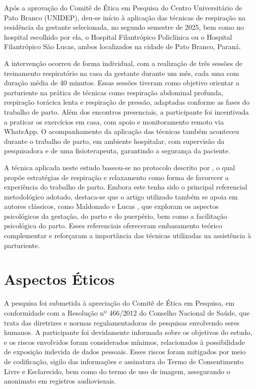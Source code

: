 \documentclass[openright]{normas-utf-tex}
\begin{document}
Após a aprovação do Comitê de Ética em Pesquisa do Centro Universitário de Pato Branco (UNIDEP), deu-se início à aplicação das técnicas de respiração na residência da gestante selecionada, no segundo semestre de 2025, bem como no hospital escolhido por ela, o Hospital Filantrópico Policlínica ou o Hospital Filantrópico São Lucas, ambos localizados na cidade de Pato Branco, Paraná.

A intervenção ocorreu de forma individual, com a realização de três sessões de treinamento respiratório na casa da gestante durante um mês, cada uma com duração média de 40 minutos. Essas sessões tiveram como objetivo orientar a parturiente na prática de técnicas como respiração abdominal profunda, respiração torácica lenta e respiração de pressão, adaptadas conforme as fases do trabalho de parto. Além dos encontros presenciais, a participante foi incentivada a praticar os exercícios em casa, com apoio e monitoramento remoto via WhatsApp. O acompanhamento da aplicação das técnicas também aconteceu durante o trabalho de parto, em ambiente hospitalar, com supervisão da pesquisadora e de uma fisioterapeuta, garantindo a segurança da paciente.

A técnica aplicada neste estudo baseou-se no protocolo descrito por , o qual propõe estratégias de respiração e relaxamento como forma de favorecer a experiência do trabalho de parto. Embora este tenha sido o principal referencial metodológico adotado, destaca-se que o artigo utilizado também se apoia em autores clássicos, como Maldonado \citeyear{maldonado1991} e Lucas \citeyear{lucas1983}, que exploram os aspectos psicológicos da gestação, do parto e do puerpério, bem como a facilitação psicológica do parto. Esses referenciais ofereceram embasamento teórico complementar e reforçaram a importância das técnicas utilizadas na assistência à parturiente.

\section{Aspectos Éticos}
\label{sec:etica}

A pesquisa foi submetida à apreciação do Comitê de Ética em Pesquisa, em conformidade com a Resolução nº 466/2012 do Conselho Nacional de Saúde, que trata das diretrizes e normas regulamentadoras de pesquisas envolvendo seres humanos. A participante foi devidamente informada sobre os objetivos do estudo, e os riscos envolvidos foram considerados mínimos, relacionados à possibilidade de exposição indevida de dados pessoais. Esses riscos foram mitigados por meio de codificação, sigilo das informações e assinatura do Termo de Consentimento Livre e Esclarecido, bem como do termo de uso de imagem, assegurando o anonimato em registros audiovisuais.
\end{document}
